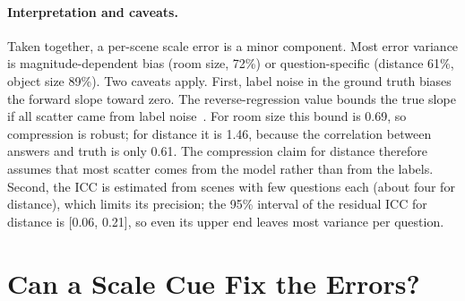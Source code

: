 \documentclass[letterpaper]{article} %
\begin{document}
\paragraph{Interpretation and caveats.}
Taken together, a per-scene scale error is a minor component. Most error variance is magnitude-dependent bias (room size, 72\%) or question-specific (distance 61\%, object size 89\%). Two caveats apply. First, label noise in the ground truth biases the forward slope toward zero. The reverse-regression value bounds the true slope if all scatter came from label noise~\citep{fuller1987measurement}. For room size this bound is 0.69, so compression is robust; for distance it is 1.46, because the correlation between answers and truth is only 0.61. The compression claim for distance therefore assumes that most scatter comes from the model rather than from the labels. Second, the ICC is estimated from scenes with few questions each (about four for distance), which limits its precision; the 95\% interval of the residual ICC for distance is [0.06, 0.21], so even its upper end leaves most variance per question.

\section{Can a Scale Cue Fix the Errors?}
\end{document}

